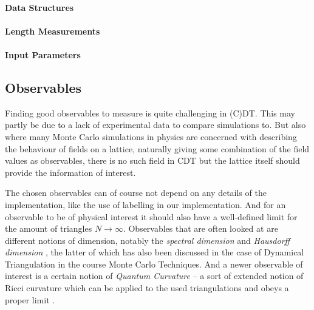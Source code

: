 \paragraph{Data Structures}

\paragraph{Length Measurements}

\paragraph{Input Parameters}



\subsection{Observables} \label{sec:observables}
Finding good observables to measure is quite challenging in (C)DT. This may partly be due to a lack of experimental data to compare simulations to.
But also where many Monte Carlo simulations in physics are concerned with describing the behaviour of fields on a lattice, naturally giving some combination of the field values as observables,
there is no such field in CDT but the lattice itself should provide the information of interest.

The chosen observables can of course not depend on any details of the implementation, like the use of labelling in our implementation.
And for an observable to be of physical interest it should also have a well-defined limit for the amount of triangles $N \rightarrow \infty$.
Observables that are often looked at are different notions of dimension, notably the \emph{spectral dimension} \cite{2012} and \emph{Hausdorff dimension} \cite{1998, 2012}, the latter of which has also been discussed in the case of Dynamical Triangulation in the course Monte Carlo Techniques. And a newer observable of interest is a certain notion of \emph{Quantum Curvature} -- a sort of extended notion of Ricci curvature which can be applied to the used triangulations and obeys a proper limit \cite{brunekreef2021}.

